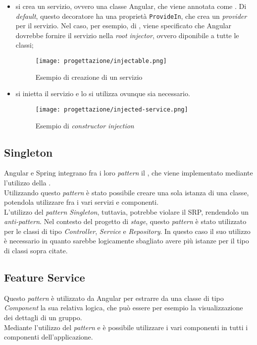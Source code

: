 \begin{itemize}
    \item si crea un servizio, ovvero una classe Angular, che viene annotata come . Di \textit{default}, questo decoratore ha una proprietà \texttt{ProvideIn}, che crea un \textit{provider} per il servizio. Nel caso, per esempio, di , viene specificato  che Angular dovrebbe fornire il servizio nella \textit{root injector}, ovvero diponibile a tutte le classi;
    \begin{figure}[H] 
        \centering 
        \texttt{[image: progettazione/injectable.png]}
        \caption{Esempio di creazione di un servizio}
    \end{figure}
    \item  si inietta il servizio e lo si utilizza ovunque sia necessario.
    \begin{figure}[H] 
        \centering 
        \texttt{[image: progettazione/injected-service.png]}
        \caption{Esempio di \textit{constructor injection}}
    \end{figure}
\end{itemize}
\subsection{Singleton}
\label{sub:Singleton}
Angular e Spring integrano fra i loro \textit{pattern} il , che viene implementato mediante l'utilizzo della .\\
Utilizzando questo \textit{pattern} è stato possibile creare una sola istanza di una classe, potendola utilizzare fra i vari servizi e componenti.\\
L'utilizzo del \textit{pattern Singleton}, tuttavia, potrebbe violare il \gls{SRP}, rendendolo un \textit{anti-pattern}. Nel contesto del progetto di \textit{stage}, questo \textit{pattern} è stato utilizzato per le classi di tipo \textit{Controller}, \textit{Service} e \textit{Repository}. In questo caso il suo utilizzo è necessario in quanto sarebbe logicamente sbagliato avere più istanze per il tipo di classi sopra citate.

\subsection{Feature Service}
Questo \textit{pattern} è utilizzato da Angular per estrarre da una classe di tipo \textit{Component} la sua relativa logica, che può essere per esempio la visualizzazione dei dettagli di un gruppo.\\
 Mediante l'utilizzo del \textit{pattern}  e  è possibile utilizzare i vari componenti in tutti i componenti dell'applicazione.
